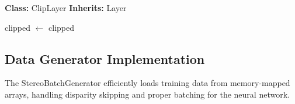 \documentclass[12pt]{article}
\begin{document}
\begin{algorithm}[H]
\caption{Clip Layer Implementation}
\begin{algorithmic}[1]
\State \textbf{Class:} ClipLayer
\State \textbf{Inherits:} Layer

    \State {}
    \State clipped $\gets$ 
    \State \Return clipped
\EndProcedure
\end{algorithmic}
\end{algorithm}

\subsection{Data Generator Implementation}
The StereoBatchGenerator efficiently loads training data from memory-mapped arrays, handling disparity skipping and proper batching for the neural network.
\end{document}
